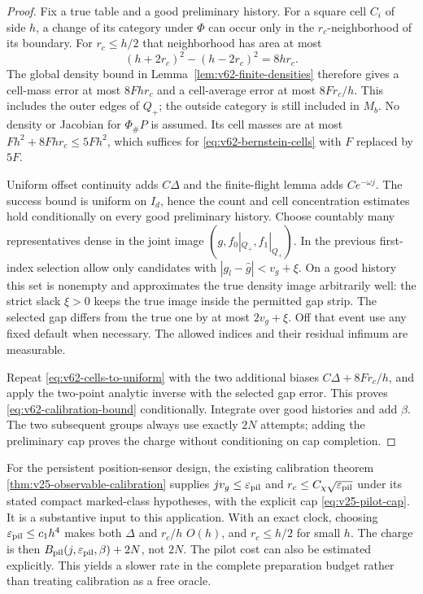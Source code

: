 \begin{proof}
Fix a true table and a good preliminary history.  For a square cell $C_i$
of side $h$, a change of its category under $\Phi$ can occur only in the
$r_c$-neighborhood of its boundary.  For $r_c\le h/2$ that neighborhood
has area at most
\[
                  (h+2r_c)^2-(h-2r_c)^2=8hr_c.
\]
The global density bound in Lemma~\ref{lem:v62-finite-densities} therefore
gives a cell-mass error at most $8Fhr_c$ and a cell-average error at most
$8Fr_c/h$.  This includes the outer edges of $Q_+$; the outside category
is still included in $M_b$.  No density or Jacobian for $\Phi_\#P$ is
assumed.  Its cell masses are at most $Fh^2+8Fhr_c\le5Fh^2$, which
suffices for \eqref{eq:v62-bernstein-cells} with $F$ replaced by $5F$.

Uniform offset continuity adds $C\Delta$ and the finite-flight lemma
adds $Ce^{-\omega j}$.  The success bound is uniform on $I_d$, hence
the count and cell concentration estimates hold conditionally on every
good preliminary history.  Choose countably many representatives dense
in the joint image $(g,f_0|_{Q_+},f_1|_{Q_+})$.  In the previous
first-index selection allow only candidates with
$|g_l-\widehat g|<v_g+\xi$.
On a good history this set is nonempty and approximates the true density
image arbitrarily well: the strict slack $\xi>0$ keeps the true image
inside the permitted gap strip.  The selected gap differs from the true
one by at most $2v_g+\xi$.  Off that event use any fixed default when
necessary.  The allowed indices and their residual infimum are measurable.

Repeat \eqref{eq:v62-cells-to-uniform} with the two additional biases
$C\Delta+8Fr_c/h$, and apply the two-point analytic inverse with the
selected gap error.  This proves \eqref{eq:v62-calibration-bound}
conditionally.  Integrate over good histories and add $\beta$.
The two subsequent groups always use exactly $2N$ attempts; adding the
preliminary cap proves the charge without conditioning on cap completion.
\end{proof}

For the persistent position-sensor design, the existing calibration theorem
\ref{thm:v25-observable-calibration} supplies
$jv_g\le\varepsilon_{\rm pil}$ and
$r_c\le C_\chi\sqrt{\varepsilon_{\rm pil}}$ under its stated compact
marked-class hypotheses, with the explicit cap
\eqref{eq:v25-pilot-cap}.  It is a substantive input to this application.
With an exact clock, choosing
$\varepsilon_{\rm pil}\le c_1h^4$ makes both $\Delta$ and $r_c/h$
$O(h)$, and $r_c\le h/2$ for small $h$.  The charge is then
$B_{\rm pil}(j,\varepsilon_{\rm pil},\beta)+2N$, not $2N$.
The pilot cost can also be estimated explicitly.  This yields a slower
rate in the complete preparation budget rather than treating calibration
as a free oracle.

